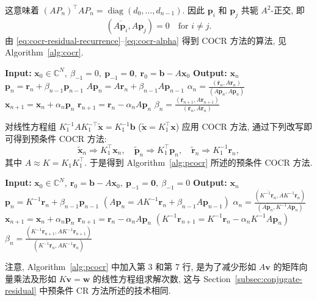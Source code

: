 {这意味着 $(AP_n)^{\top}AP_n=\operatorname{diag}(d_0,\ldots,d_{n-1})$. 因此 $\bm p_i$ 和 $\bm p_j$ 共轭 $A^2$-正交, 即}
\[(\overline{A\bm p_i},A\bm p_j)=0\quad\text{for }i\ne j.\]
{由 \eqref{eq:cocr-residual-recurrence}--\eqref{eq:cocr-alpha} 得到 COCR 方法的算法, 见 Algorithm\ \ref{alg:cocr}.}
\begin{algorithm}[H]\caption{{COCR 方法 (注意: $(\bar{\bm a},\bm b)=\bm a^{\top}\bm b$)}}\label{alg:cocr}\begin{algorithmic}[1]
\Statex\textbf{Input:} $\bm x_0\in\mathbb C^N,\ \beta_{-1}=0,\ \bm p_{-1}=\bm0,\ \bm r_0=\bm b-A\bm x_0$
\Statex\textbf{Output:} $\bm x_n$
\State $\bm p_n=\bm r_n+\beta_{n-1}\bm p_{n-1}$
\State $A\bm p_n=A\bm r_n+\beta_{n-1}A\bm p_{n-1}$
\State $\alpha_n=\frac{(\bar{\bm r}_n,A\bm r_n)}{(\overline{A\bm p_n},A\bm p_n)}$
\State $\bm x_{n+1}=\bm x_n+\alpha_n\bm p_n$
\State $\bm r_{n+1}=\bm r_n-\alpha_nA\bm p_n$
\State $\beta_n=\frac{(\bar{\bm r}_{n+1},A\bm r_{n+1})}{(\bar{\bm r}_n,A\bm r_n)}$
\EndFor\end{algorithmic}\end{algorithm}
{对线性方程组 $K_1^{-1}AK_1^{-\top}\widetilde{\bm x}=K_1^{-1}\bm b$ ($\widetilde{\bm x}=K_1^{\top}\bm x$) 应用 COCR 方法, 通过下列改写即可得到预条件 COCR 方法:}
\[\widetilde{\bm x}_n\Rightarrow K_1^{\top}\bm x_n,\quad\widetilde{\bm p}_n\Rightarrow K_1^{\top}\bm p_n,\quad\widetilde{\bm r}_n\Rightarrow K_1^{-1}\bm r_n,\]
{其中 $A\approx K=K_1K_1^{\top}$. 于是得到 Algorithm\ \ref{alg:pcocr} 所述的预条件 COCR 方法.}
\begin{algorithm}[H]\caption{{预条件 COCR 方法 (注意: $(\bar{\bm a},\bm b)=\bm a^{\top}\bm b$)}}\label{alg:pcocr}\label{srcpage:printed-97}\begin{algorithmic}[1]
\Statex\textbf{Input:} $\bm x_0\in\mathbb C^N,\ \bm r_0=\bm b-A\bm x_0,\ \bm p_{-1}=\bm0,\ \beta_{-1}=0$
\Statex\textbf{Output:} $\bm x_n$
\State $\bm p_n=K^{-1}\bm r_n+\beta_{n-1}\bm p_{n-1}$
\State $(A\bm p_n=AK^{-1}\bm r_n+\beta_{n-1}A\bm p_{n-1})$
\State $\alpha_n=\frac{(\overline{K^{-1}\bm r_n},AK^{-1}\bm r_n)}{(\overline{A\bm p_n},K^{-1}A\bm p_n)}$
\State $\bm x_{n+1}=\bm x_n+\alpha_n\bm p_n$
\State $\bm r_{n+1}=\bm r_n-\alpha_nA\bm p_n$
\State $(K^{-1}\bm r_{n+1}=K^{-1}\bm r_n-\alpha_nK^{-1}A\bm p_n)$
\State $\beta_n=\frac{(\overline{K^{-1}\bm r_{n+1}},AK^{-1}\bm r_{n+1})}{(\overline{K^{-1}\bm r_n},AK^{-1}\bm r_n)}$
\EndFor\end{algorithmic}\end{algorithm}
{注意, Algorithm\ \ref{alg:pcocr} 中加入第 3 和第 7 行, 是为了减少形如 $A\bm v$ 的矩阵向量乘法及形如 $K\bm v=\bm w$ 的线性方程组求解次数, 这与 Section\ \ref{subsec:conjugate-residual} 中预条件 CR 方法所述的技术相同.}
